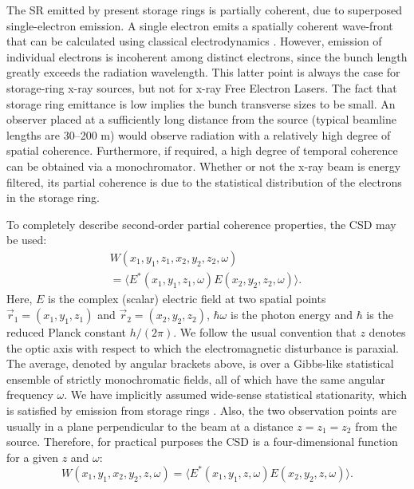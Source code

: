 \documentclass[%
 reprint,
 amsmath,amssymb,
 aps,
]{revtex4-1}
\begin{document}
The SR emitted by present storage rings is partially coherent, due to superposed single-electron emission. A single electron emits a spatially coherent wave-front that can be calculated using classical electrodynamics \cite{jackson}. However, emission of individual electrons is incoherent among distinct electrons, since the bunch length greatly exceeds the radiation wavelength.  This latter point is always the case for storage-ring x-ray sources, but not for x-ray Free Electron Lasers. The fact that storage ring emittance is low implies the bunch transverse sizes to be small. An observer placed at a sufficiently long distance from the source (typical beamline lengths are 30--200 m) would observe  radiation with a relatively high degree of  spatial coherence. Furthermore, if required, a high degree of temporal coherence can be obtained via a monochromator.  Whether or not the x-ray beam is energy filtered, its partial coherence is due to the statistical distribution of the electrons in the storage ring. 

To completely describe second-order partial coherence properties, the CSD \cite{Wolf1982,mandel_wolf} may be used: 
\begin{eqnarray}
\nonumber W(x_1,y_1,z_1,x_2,y_2,z_2,\omega) \quad\quad\quad\quad\quad\quad \\ = \langle E^{*}(x_1,y_1,z_1,\omega) E(x_2,y_2,z_2,\omega) \rangle.\label{eq:CSD}
\end{eqnarray}
Here, $E$ is the complex (scalar) electric field at two spatial points $\vec{r}_1=(x_1,y_1,z_1)$ and $\vec{r}_2=(x_2,y_2,z_2)$, $\hbar\omega$ is the photon energy and $\hbar$ is the reduced Planck constant $h/(2\pi)$.  We follow the usual convention that $z$ denotes the optic axis with respect to which the electromagnetic disturbance is paraxial. The average, denoted by angular brackets above, is over a Gibbs-like statistical ensemble of strictly monochromatic fields, all of which have the same angular frequency $\omega$. We have implicitly assumed wide-sense statistical stationarity, which is satisfied by emission from storage rings \cite{geloni}. Also, the two observation points are usually in a plane perpendicular to the beam at a distance $z=z_1=z_2$ from the source. Therefore, for practical purposes the CSD is a four-dimensional function for a given $z$ and $\omega$: 
\begin{equation}
W(x_1,y_1,x_2,y_2,z,\omega) = 
\langle E^{*}(x_1,y_1,z,\omega) E(x_2,y_2,z,\omega)\rangle.
\end{equation}
\end{document}
